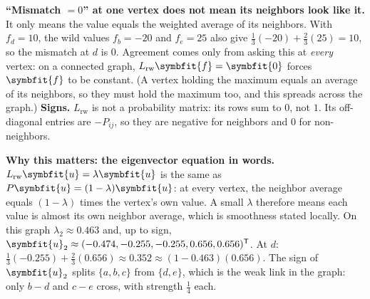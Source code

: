 \documentclass[11pt]{article}
\newcommand{\bm}[1]{\symbfit{#1}}
\newcommand{\vu}{\bm{u}}
\newcommand{\T}{^{\mathsf T}}
\begin{document}
\begin{careful}
\textbf{``Mismatch $=0$'' at one vertex does not mean its neighbors look like it.} It only means the value equals the weighted average of its neighbors. With $f_d=10$, the wild values $f_b=-20$ and $f_e=25$ also give $\tfrac13(-20)+\tfrac23(25)=10$, so the mismatch at $d$ is $0$. Agreement comes only from asking this at \emph{every} vertex: on a connected graph, $L_{\mathrm{rw}}\bm f=\bm0$ forces $\bm f$ to be constant. (A vertex holding the maximum equals an average of its neighbors, so they must hold the maximum too, and this spreads across the graph.)
\textbf{Signs.} $L_{\mathrm{rw}}$ is not a probability matrix: its rows sum to $0$, not $1$. Its off-diagonal entries are $-P_{ij}$, so they are negative for neighbors and $0$ for non-neighbors.
\end{careful}

\textbf{Why this matters: the eigenvector equation in words.} $L_{\mathrm{rw}}\vu=\lambda\vu$ is the same as $P\vu=(1-\lambda)\vu$: at every vertex, the neighbor average equals $(1-\lambda)$ times the vertex's own value. A small $\lambda$ therefore means each value is almost its own neighbor average, which is smoothness stated locally. On this graph $\lambda_2\approx0.463$ and, up to sign, $\vu_2\approx(-0.474,-0.255,-0.255,0.656,0.656)\T$. At $d$: $\tfrac13(-0.255)+\tfrac23(0.656)\approx0.352\approx(1-0.463)(0.656)$. The sign of $\vu_2$ splits $\{a,b,c\}$ from $\{d,e\}$, which is the weak link in the graph: only $b{-}d$ and $c{-}e$ cross, with strength $\tfrac14$ each.
\end{document}
